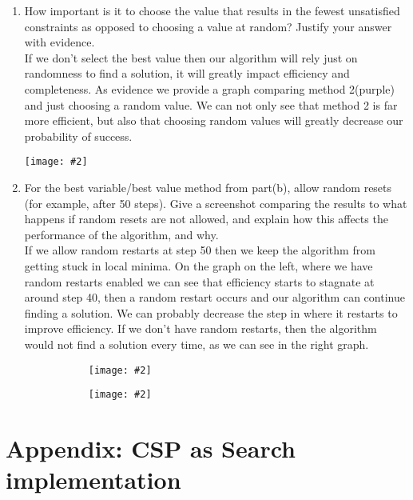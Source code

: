 \documentclass{article}
\def\ans#1{{\color{ans}#1}}
\newcommand{\centerfig}[2]{\begin{center}\texttt{[image: \#2]}\end{center}}
\begin{document}
\begin{enumerate}[label=(\alph*)]
{    }
    \begin{center}
        \begin{figure}[htp]
        \begin{subfigure}[b]{0.5\textwidth} \color{ans}
            \centerfig{1}{../figs/q4_c_1.png}
        \end{subfigure}
        \begin{subfigure}[b]{0.5\textwidth} \color{ans}
            \centerfig{1}{../figs/q4_c_2.png}
        \end{subfigure}
        \end{figure}
    \end{center}
    \item How important is it to choose the value that results in the fewest unsatisfied constraints as opposed to choosing a value at random? Justify your answer with evidence.\\
    \ans{
        If we don’t select the best value then our algorithm will rely just on randomness to find a 
        solution, it will greatly impact efficiency and completeness. As evidence we provide a graph 
        comparing method 2(purple) and just choosing a random value. We can not only see that method 2 
        is far more efficient, but also that choosing random values will greatly decrease our probability 
        of success.
    }
    \centerfig{0.8}{../figs/q4_c_3.png}
    \item For the best variable/best value method from part(b), allow random resets (for example, after 50 steps). Give a screenshot comparing the results to what happens if random resets are not allowed, and explain how this affects the performance of the algorithm, and why.\\
    \ans{
        If we allow random restarts at step 50 then we keep the algorithm from getting stuck in local minima. 
        On the graph on the left, where we have random restarts enabled we can see that efficiency starts 
        to stagnate at around step 40, then a random restart occurs and our algorithm can continue 
        finding a solution. We can probably decrease the step in where it restarts to improve efficiency. 
        If we don’t have random restarts, then the algorithm would not find a solution every time, as we 
        can see in the right graph.
    }
    \begin{center}
        \begin{figure}[htp]
        \begin{subfigure}[b]{0.5\textwidth} \color{ans}
            \centerfig{1}{../figs/q4_c_4.png}
        \end{subfigure}
        \begin{subfigure}[b]{0.5\textwidth} \color{ans}
            \centerfig{1}{../figs/q4_c_5.png}
        \end{subfigure}
        \end{figure}
    \end{center}
\end{enumerate}

\clearpage
\appendix

\section{Appendix: CSP as Search implementation}
\label{appendix:CSP Search}
\begin{center}
    
\end{center}
\end{document}
